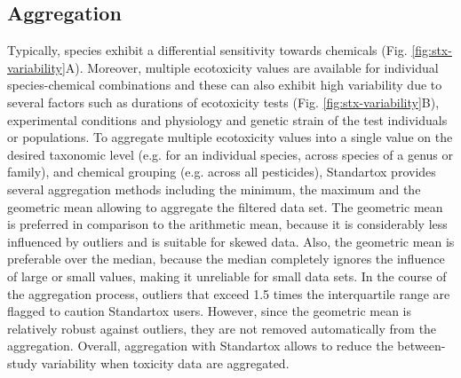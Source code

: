 \documentclass[journal,datadescriptor,accept,moreauthors,pdftex]{Definitions/mdpi}
\begin{document}
\subsection{Aggregation}
Typically, species exhibit a differential sensitivity towards chemicals (Fig. \ref{fig:stx-variability}A). Moreover, multiple ecotoxicity values are available for individual species-chemical combinations and these can also exhibit high variability due to several factors such as durations of ecotoxicity tests (Fig. \ref{fig:stx-variability}B), experimental conditions and physiology and genetic strain of the test individuals or populations. To aggregate multiple ecotoxicity values into a single value on the desired taxonomic level (e.g. for an individual species, across species of a genus or family), and chemical grouping (e.g. across all pesticides), Standartox provides several aggregation methods including the minimum, the maximum and the geometric mean allowing to aggregate the filtered data set. The geometric mean is preferred in comparison to the arithmetic mean, because it is considerably less influenced by outliers and is suitable for skewed data. Also, the geometric mean is preferable over the median, because the median completely ignores the influence of large or small values, making it unreliable for small data sets. In the course of the aggregation process, outliers that exceed 1.5 times the interquartile range are flagged to caution Standartox users. However, since the geometric mean is relatively robust against outliers, they are not removed automatically from the aggregation. Overall, aggregation with Standartox allows to reduce the between-study variability when toxicity data are aggregated.
\end{document}
